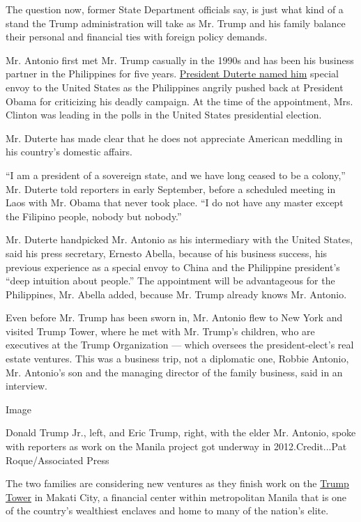 The question now, former State Department officials say, is just what
kind of a stand the Trump administration will take as Mr. Trump and his
family balance their personal and financial ties with foreign policy
demands.

Mr. Antonio first met Mr. Trump casually in the 1990s and has been his
business partner in the Philippines for five years.
\href{http://www.nytimes.com/2016/11/10/world/asia/donald-trump-philippines-jose-antonio.html?_r=0}{President
Duterte named him} special envoy to the United States as the Philippines
angrily pushed back at President Obama for criticizing his deadly
campaign. At the time of the appointment, Mrs. Clinton was leading in
the polls in the United States presidential election.

Mr. Duterte has made clear that he does not appreciate American meddling
in his country's domestic affairs.

``I am a president of a sovereign state, and we have long ceased to be a
colony,'' Mr. Duterte told reporters in early September, before a
scheduled meeting in Laos with Mr. Obama that never took place. ``I do
not have any master except the Filipino people, nobody but nobody.''

Mr. Duterte handpicked Mr. Antonio as his intermediary with the United
States, said his press secretary, Ernesto Abella, because of his
business success, his previous experience as a special envoy to China
and the Philippine president's ``deep intuition about people.'' The
appointment will be advantageous for the Philippines, Mr. Abella added,
because Mr. Trump already knows Mr. Antonio.

Even before Mr. Trump has been sworn in, Mr. Antonio flew to New York
and visited Trump Tower, where he met with Mr. Trump's children, who are
executives at the Trump Organization --- which oversees the
president-elect's real estate ventures. This was a business trip, not a
diplomatic one, Robbie Antonio, Mr. Antonio's son and the managing
director of the family business, said in an interview.

Image

Donald Trump Jr., left, and Eric Trump, right, with the elder Mr.
Antonio, spoke with reporters as work on the Manila project got underway
in 2012.Credit...Pat Roque/Associated Press

The two families are considering new ventures as they finish work on the
\href{http://www.trumptowerphilippines.com/condo.html}{Trump Tower} in
Makati City, a financial center within metropolitan Manila that is one
of the country's wealthiest enclaves and home to many of the nation's
elite.

